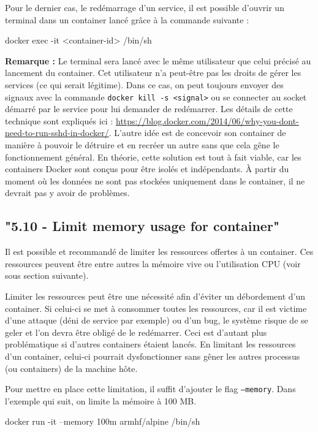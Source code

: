 \documentclass[11pt,a4paper,oneside]{report}
\newcommand{\code}[1]{\texttt{#1}}
\begin{document}
Pour le dernier cas, le redémarrage d'un service, il est possible d'ouvrir un terminal dans un container lancé grâce à la commande suivante :
\begin{bashcode}
docker exec -it <container-id> /bin/sh
\end{bashcode}

\textbf{Remarque : } Le terminal sera lancé avec le même utilisateur que celui précisé au lancement du container. Cet utilisateur n'a peut-être pas les droits de gérer les services (ce qui serait légitime). Dans ce cas, on peut toujours envoyer des signaux avec la commande \code{docker kill -s <signal>} ou se connecter au socket démarré par le service pour lui demander de redémarrer. Les détails de cette technique sont expliqués ici : \url{https://blog.docker.com/2014/06/why-you-dont-need-to-run-sshd-in-docker/}. L'autre idée est de concevoir son container de manière à pouvoir le détruire et en recréer un autre sans que cela gêne le fonctionnement général. En théorie, cette solution est tout à fait viable, car les containers Docker sont conçus pour être isolés et indépendants. À partir du moment où les données ne sont pas stockées uniquement dans le container, il ne devrait pas y avoir de problèmes.

\subsection{"5.10 - Limit memory usage for container"}\label{limit_memory_usage}
Il est possible et recommandé de limiter les ressources offertes à un container. Ces ressources peuvent être entre autres la mémoire vive ou l'utilisation CPU (voir sous section suivante).

Limiter les ressources peut être une nécessité afin d'éviter un débordement d'un container. Si celui-ci se met à consommer toutes les ressources, car il est victime d'une attaque (déni de service par exemple) ou d'un bug, le système risque de se geler et l'on devra être obligé de le redémarrer. Ceci est d'autant plus problématique si d'autres containers étaient lancés. En limitant les ressources d'un container, celui-ci pourrait dysfonctionner sans gêner les autres processus (ou containers) de la machine hôte.

Pour mettre en place cette limitation, il suffit d'ajouter le flag \code{--memory}. Dans l'exemple qui suit, on limite la mémoire à 100 MB.

\begin{bashcode}
docker run -it --memory 100m armhf/alpine /bin/sh
\end{bashcode}
\end{document}
